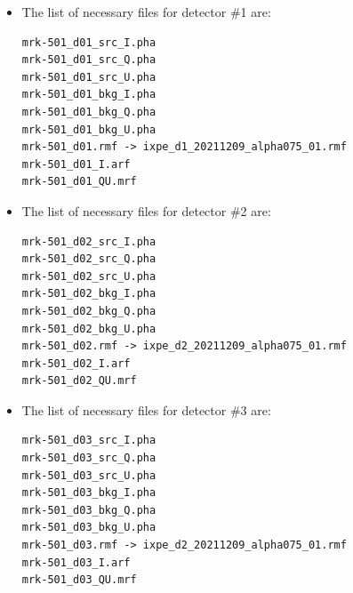 \begin{itemize}
\begin{enumerate}
            \textbf{To generate an ARF (for $I$ spectrum):}
            \begin{verbatim}
pararover@shadowfax: ixpecalcarf \
> evtfile=ixpe01004701_det2_evt2_v01.fits \
> attfiles=ixpe01004701_det2_att_v01.fits \
> arfout=mrk-501_d02_I.arf \
> specfile=none radius=1.0 weight=1 resptype=arf
            \end{verbatim}

            \item For detector \#3:

            \textbf{To generate an MRF (for $Q$ and $U$ spectra):}
            \begin{verbatim}
pararover@shadowfax: ixpecalcarf \
> evtfile=ixpe01004701_det3_evt2_v01.fits \
> attfiles=ixpe01004701_det3_att_v01.fits \
> arfout=mrk-501_d03_QU.mrf \
> specfile=none radius=1.0 weight=1 resptype=mrf
            \end{verbatim}

            \textbf{To generate an ARF (for $I$ spectrum):}
            \begin{verbatim}
pararover@shadowfax: ixpecalcarf \
> evtfile=ixpe01004701_det3_evt2_v01.fits \
> attfiles=ixpe01004701_det3_att_v01.fits \
> arfout=mrk-501_d03_I.arf \
> specfile=none radius=1.0 weight=1 resptype=arf
            \end{verbatim}
        \end{enumerate}

        \item The list of necessary files for detector \#1 are:
        \begin{verbatim}
mrk-501_d01_src_I.pha
mrk-501_d01_src_Q.pha
mrk-501_d01_src_U.pha
mrk-501_d01_bkg_I.pha
mrk-501_d01_bkg_Q.pha
mrk-501_d01_bkg_U.pha
mrk-501_d01.rmf -> ixpe_d1_20211209_alpha075_01.rmf
mrk-501_d01_I.arf
mrk-501_d01_QU.mrf
        \end{verbatim}

        \item The list of necessary files for detector \#2 are:
        \begin{verbatim}
mrk-501_d02_src_I.pha
mrk-501_d02_src_Q.pha
mrk-501_d02_src_U.pha
mrk-501_d02_bkg_I.pha
mrk-501_d02_bkg_Q.pha
mrk-501_d02_bkg_U.pha
mrk-501_d02.rmf -> ixpe_d2_20211209_alpha075_01.rmf
mrk-501_d02_I.arf
mrk-501_d02_QU.mrf
        \end{verbatim}

        \item The list of necessary files for detector \#3 are:
        \begin{verbatim}
mrk-501_d03_src_I.pha
mrk-501_d03_src_Q.pha
mrk-501_d03_src_U.pha
mrk-501_d03_bkg_I.pha
mrk-501_d03_bkg_Q.pha
mrk-501_d03_bkg_U.pha
mrk-501_d03.rmf -> ixpe_d2_20211209_alpha075_01.rmf
mrk-501_d03_I.arf
mrk-501_d03_QU.mrf
        \end{verbatim}
        

\end{itemize}
